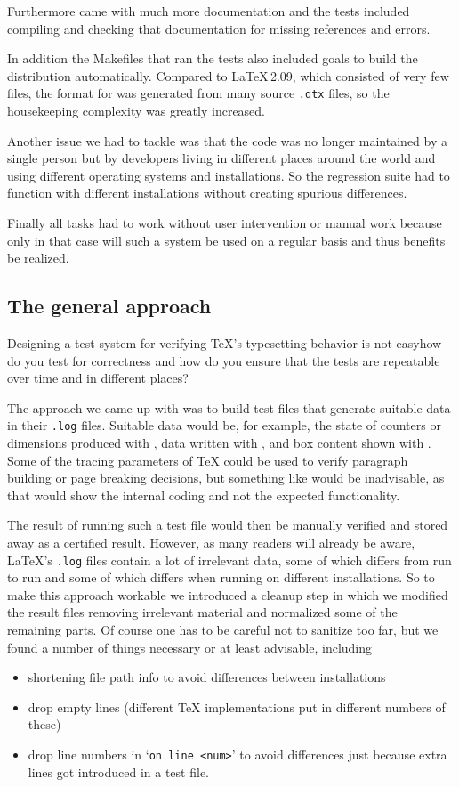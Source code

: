 \documentclass[final]{ltugboat}
\begin{document}
Furthermore \LaTeXe{} came with much more documentation and the
tests included compiling and checking that documentation for missing
references and errors.

In addition the Makefiles that ran the tests also included goals to
build the distribution automatically.  Compared to \LaTeX\,2.09,
which consisted of very few files, the format for \LaTeXe{} was
generated from many source \texttt{.dtx} files, so the housekeeping
complexity was greatly increased.

Another issue we had to tackle was that the code was no longer
maintained by a single person but by developers living in different
places around the world and using different operating systems and
installations. So the regression suite had to function with different
installations without creating spurious differences.

Finally all tasks had to work without user intervention or manual work because
only in that case will such a system be used on a regular basis
and thus benefits be realized.


\subsection{The general approach}

Designing a test system for verifying \TeX's typesetting behavior is
not easy\Dash how do you test for correctness and how do you ensure
that the tests are repeatable over time and in different places?

The approach we came up with was to build test files that generate
suitable data in their \texttt{.log} files. Suitable data would be, for
example,
the state of counters or dimensions produced with , data
written with , and box content shown with
. Some of the tracing parameters of \TeX{} could be used to
verify paragraph building or page breaking decisions, but something
like  would be inadvisable, as that would show the
internal coding and not the expected functionality.

The result of running such a test file would then be manually verified
and stored away as a certified result. However, as many readers will
already be aware,
\LaTeX's \texttt{.log} files contain a lot of irrelevant data, some of
which differs from run to run and some of which differs when running
on different installations. So to make this approach workable we
introduced a cleanup step in which we modified the result files
removing irrelevant material and normalized some of the remaining
parts. Of course one has to be careful not to sanitize too far, but we
found a number of things necessary or at least advisable, including
\begin{itemize}
\item  shortening file path info to avoid differences between
installations
\item drop empty lines (different \TeX{} implementations put
in different numbers of these)
\item drop line numbers in `\texttt{on line <num>}' to avoid differences
 just because extra lines got introduced in a test file.
\end{itemize}
\end{document}
